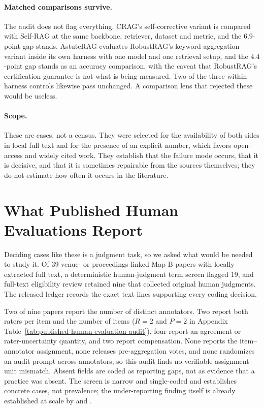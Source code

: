 \documentclass[11pt]{article}
\begin{document}
\paragraph{Matched comparisons survive.}
The audit does not flag everything. CRAG's self-corrective variant is compared
with Self-RAG at the same backbone, retriever, dataset and metric, and the
$6.9$-point gap stands. AstuteRAG evaluates RobustRAG's keyword-aggregation
variant inside its own harness with one model and one retrieval setup, and the
$4.4$-point gap stands as an accuracy comparison, with the caveat that
RobustRAG's certification guarantee is not what is being measured. Two of the
three within-harness controls likewise pass unchanged. A comparison lens that rejected
these would be useless.

\paragraph{Scope.}
These are cases, not a census. They were selected for the availability of both
sides in local full text and for the presence of an explicit number, which
favors open-access and widely cited work. They establish that the failure mode
occurs, that it is decisive, and that it is sometimes repairable from the
sources themselves; they do not estimate how often it occurs in the
literature.

\section{What Published Human Evaluations Report}
\label{sec:published-audit}

Deciding cases like these is a judgment task, so we asked what would be needed
to study it. Of 39 venue- or proceedings-linked Map B papers with locally
extracted full text, a deterministic human-judgment term screen flagged 19,
and full-text eligibility review retained nine that collected original human
judgments. The released ledger records the exact text lines supporting every
coding decision.

Two of nine papers report the number of distinct annotators. Two report both
raters per item and the number of items ($R=2$ and $P=2$ in Appendix
Table~\ref{tab:published-human-evaluation-audit}), four report an agreement or
rater-uncertainty quantity, and two report compensation. None reports the
item--annotator assignment, none releases pre-aggregation votes, and none
randomizes an audit prompt across annotators, so this audit finds no
verifiable assignment-unit mismatch. Absent fields are coded as reporting
gaps, not as evidence that a practice was absent. The screen is narrow and
single-coded and establishes concrete cases, not prevalence; the
under-reporting finding itself is already established at scale by
\citet{howcroft2020twenty} and \citet{vanderlee2021human}.
\end{document}
